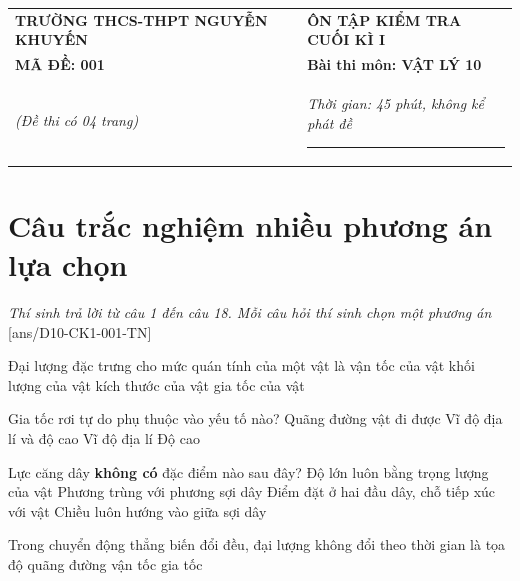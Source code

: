 \begin{center}
	\begin{tabular}{M{10cm}M{8cm}}
		\textbf{TRƯỜNG THCS-THPT NGUYỄN KHUYẾN}& \textbf{ÔN TẬP KIỂM TRA CUỐI KÌ I}\\
		\textbf{MÃ ĐỀ: 001}& \textbf{Bài thi môn: VẬT LÝ 10}\\
		\textit{(Đề thi có 04 trang)}& \textit{Thời gian: 45 phút, không kể phát đề}
		
		\noindent\rule{4cm}{0.8pt} \\
	\end{tabular}
\end{center}
\setcounter{section}{0}
\section{Câu trắc nghiệm nhiều phương án lựa chọn}
\textit{Thí sinh trả lời từ câu 1 đến câu 18. Mỗi câu hỏi thí sinh chọn một phương án}
\setcounter{ex}{0}
[ans/D10-CK1-001-TN]

\begin{ex}
	Đại lượng đặc trưng cho mức quán tính của một vật là
	\choice
	{vận tốc của vật}
	{\True khối lượng của vật}
	{kích thước của vật}
	{gia tốc của vật}
	\loigiai{}
\end{ex}
\begin{ex}
	Gia tốc rơi tự do phụ thuộc vào yếu tố nào?
	\choice
	{Quãng đường vật đi được}
	{\True Vĩ độ địa lí và độ cao}
	{Vĩ độ địa lí}
	{Độ cao}
	\loigiai{}
\end{ex}
\begin{ex}
	Lực căng dây \textbf{không có} đặc điểm nào sau đây?
	\choice
	{\True Độ lớn luôn bằng trọng lượng của vật}
	{Phương trùng với phương sợi dây}
	{Điểm đặt ở hai đầu dây, chỗ tiếp xúc với vật}
	{Chiều luôn hướng vào giữa sợi dây}
	\loigiai{}
\end{ex}
\begin{ex}
	Trong chuyển động thẳng biến đổi đều, đại lượng không đổi theo thời gian là
	\choice
	{tọa độ}
	{quãng đường}
	{vận tốc}
	{\True gia tốc}
	\loigiai{}
\end{ex}


